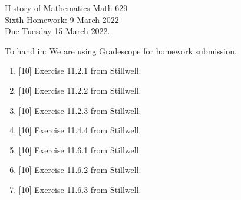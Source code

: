 \documentclass[12pt]{article}
\begin{document}
\LARGE 
\noindent
{\color{Maroon}History of Mathematics \hfill Math 629}\vspace{2pt}\\
\large
Sixth Homework: \hfill 9 March 2022\\
Due Tuesday 15 March 2022.
\normalsize\vspace{10pt}

To hand in: We are using Gradescope for homework submission.


\begin{enumerate}

\item  {[10]}
     Exercise 11.2.1 from Stillwell.

\item  {[10]}
     Exercise 11.2.2 from Stillwell.

\item  {[10]}
     Exercise 11.2.3 from Stillwell.

\item  {[10]}
     Exercise 11.4.4 from Stillwell.

\item  {[10]}
     Exercise 11.6.1 from Stillwell.

\item  {[10]}
     Exercise 11.6.2 from Stillwell.

\item  {[10]}
     Exercise 11.6.3 from Stillwell.

 \end{enumerate}
\end{document}

